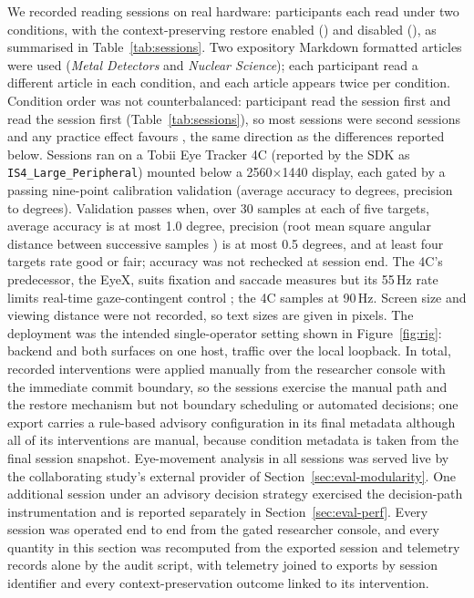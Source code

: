 We recorded \sessionsN{} reading sessions on real hardware: \participantsN{} participants each read under two conditions, with the context-preserving restore enabled (\on{}) and disabled (\off{}), as summarised in Table~\ref{tab:sessions}.
Two expository Markdown formatted articles were used (\emph{Metal Detectors} and \emph{Nuclear Science}); each participant read a different article in each condition, and each article appears twice per condition.
Condition order was not counterbalanced: \orderWithFirst{} participant read the \on{} session first and \orderWithoutFirst{} read the \off{} session first (Table~\ref{tab:sessions}), so most \on{} sessions were second sessions and any practice effect favours \on{}, the same direction as the differences reported below.
Sessions ran on a Tobii Eye Tracker 4C (reported by the SDK as \texttt{IS4\_Large\_Peripheral}) mounted below a 2560$\times$1440 display, each gated by a passing nine-point calibration validation (average accuracy \calAccMin{} to \calAccMax{} degrees, precision \calPrecMin{} to \calPrecMax{} degrees).
Validation passes when, over 30 samples at each of five targets, average accuracy is at most 1.0 degree, precision (root mean square angular distance between successive samples \cite{holmqvist2012quality}) is at most 0.5 degrees, and at least four targets rate good or fair; accuracy was not rechecked at session end.
The 4C's predecessor, the EyeX, suits fixation and saccade measures but its 55\,Hz rate limits real-time gaze-contingent control \cite{gibaldi2017eyex}; the 4C samples at 90\,Hz.
Screen size and viewing distance were not recorded, so text sizes are given in pixels.
The deployment was the intended single-operator setting shown in Figure~\ref{fig:rig}: backend and both surfaces on one host, traffic over the local loopback.
In total, \interventionsTotal{} recorded interventions were applied manually from the researcher console with the immediate commit boundary, so the sessions exercise the manual path and the restore mechanism but not boundary scheduling or automated decisions; one export carries a rule-based advisory configuration in its final metadata although all of its interventions are manual, because condition metadata is taken from the final session snapshot.
Eye-movement analysis in all \sessionsN{} sessions was served live by the collaborating study's external provider of Section~\ref{sec:eval-modularity}.
One additional session under an advisory decision strategy exercised the decision-path instrumentation and is reported separately in Section~\ref{sec:eval-perf}.
Every session was operated end to end from the gated researcher console, and every quantity in this section was recomputed from the exported session and telemetry records alone by the audit script, with telemetry joined to exports by session identifier and every context-preservation outcome linked to its intervention.

